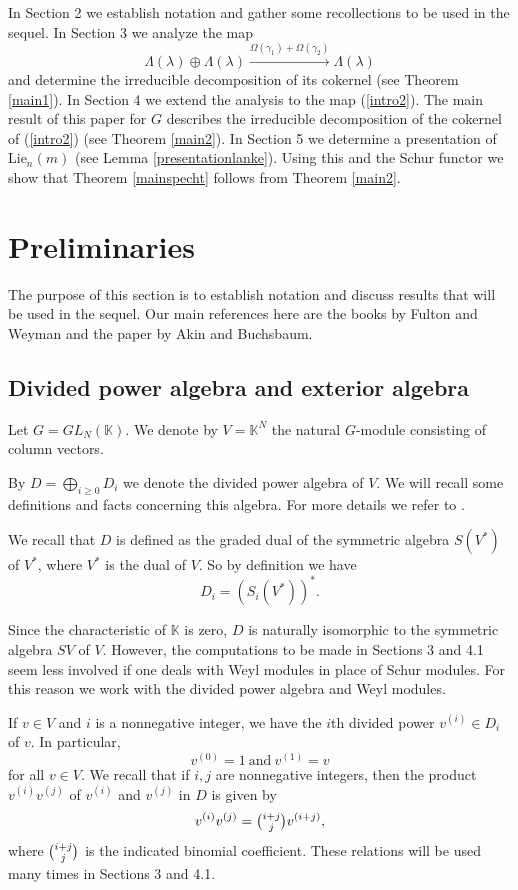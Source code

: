 \documentclass[11pt]{amsart}
\theoremstyle{definition}
\numberwithin{equation}{section}
\begin{document}
In Section 2 we establish notation and gather some recollections to be used in the sequel. In Section 3 we analyze the map \[\Lambda(\lambda) \oplus \Lambda(\lambda) \xrightarrow{\Omega(\gamma_1) + \Omega(\gamma_2)} \Lambda(\lambda)\] and determine the irreducible decomposition of its cokernel (see Theorem \ref{main1}). In Section 4 we extend the analysis to the map (\ref{intro2}). The main result of this paper for $G$ describes the irreducible decomposition of the cokernel of (\ref{intro2}) (see Theorem \ref{main2}). In Section 5 we determine a presentation of $\text{Lie}_n(m)$ (see Lemma \ref{presentationlanke}). Using this and the Schur functor we show that Theorem \ref{mainspecht} follows from Theorem \ref{main2}.
\section{Preliminaries}
The purpose of this section is to establish notation and discuss results that will be used in the sequel. Our main references here are the books by Fulton \cite{F} and  Weyman \cite{W} and the paper \cite{AB} by Akin and Buchsbaum.
\subsection{Divided power algebra and exterior algebra}
Let $G=GL_N(\mathbb{K})$. We denote by $V=\mathbb{K}^N$  the natural $G$-module consisting of column vectors.

By $D=\bigoplus_{i\geq 0}D_i$ we denote the divided power algebra of $V$. We will recall some definitions and facts concerning this algebra. For more details we refer to \cite[Section 1.1]{W}. 

We recall that $D$ is defined as the graded dual of the symmetric algebra $S(V^*)$ of $V^*$, where $V^*$ is the dual of $V$. So by definition we have \[D_i = (S_i(V^*))^*.\] 

Since the characteristic of $\mathbb{K}$ is zero, $D$ is naturally isomorphic to the symmetric algebra $SV$ of $V$. However, the computations to be made in Sections 3 and 4.1 seem less involved if one deals with Weyl modules in place of Schur modules. For this reason we work with the divided power algebra and Weyl modules.

	If $v \in V$ and $i$ is a nonnegative integer, we have the $i$th divided power  $v^{(i)} \in D_i$ of $v$. In particular, \[ v^{(0)}=1 \ \mathrm{and} \ v^{(1)}=v\] for all $v \in V$. We recall that if $i,j$ are nonnegative integers, then the product $v^{(i)}v^{(j)}$ of $v^{(i)}$ and $v^{(j)}$ in $D$ is given by \[v^{(i)}v^{(j)}=\tbinom{i+j}{j}v^{(i+j)},\] where $\tbinom{i+j}{j}$ is the indicated binomial coefficient. These relations will be used many times in Sections 3 and 4.1.
\end{document}

